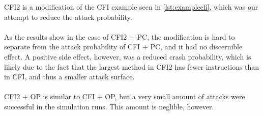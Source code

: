 CFI2 is a modification of the CFI example seen in \cref{lst:examplecfi}, which was our attempt to reduce the attack probability.\\\\
As the results show in the case of CFI2 + PC, the modification is hard to separate from the attack probability of CFI + PC, and it had no discernible effect. A positive side effect, however, was a reduced crash probability, which is likely due to the fact that the largest method in CFI2 has fewer instructions than in CFI, and thus a smaller attack surface.\\\\
CFI2 + OP is similar to CFI + OP, but a very small amount of attacks were successful in the simulation runs. This amount is neglible, however.